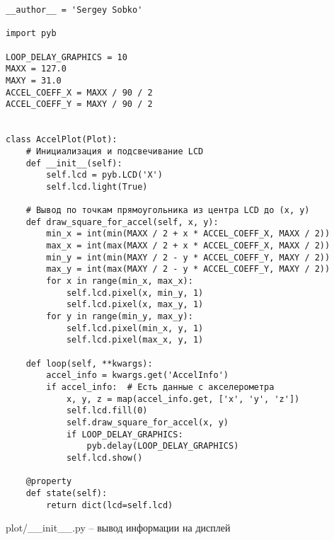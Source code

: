\documentclass[document.tex]{subfiles}
\begin{document}
\begin{listing}[ht]
\begin{verbatim}
__author__ = 'Sergey Sobko'

import pyb

LOOP_DELAY_GRAPHICS = 10
MAXX = 127.0
MAXY = 31.0
ACCEL_COEFF_X = MAXX / 90 / 2
ACCEL_COEFF_Y = MAXY / 90 / 2


class AccelPlot(Plot):
    # Инициализация и подсвечивание LCD
    def __init__(self):
        self.lcd = pyb.LCD('X')
        self.lcd.light(True) 
    
    # Вывод по точкам прямоугольника из центра LCD до (x, y)
    def draw_square_for_accel(self, x, y):
        min_x = int(min(MAXX / 2 + x * ACCEL_COEFF_X, MAXX / 2))
        max_x = int(max(MAXX / 2 + x * ACCEL_COEFF_X, MAXX / 2))
        min_y = int(min(MAXY / 2 - y * ACCEL_COEFF_Y, MAXY / 2))
        max_y = int(max(MAXY / 2 - y * ACCEL_COEFF_Y, MAXY / 2))
        for x in range(min_x, max_x):
            self.lcd.pixel(x, min_y, 1)
            self.lcd.pixel(x, max_y, 1)
        for y in range(min_y, max_y):
            self.lcd.pixel(min_x, y, 1)
            self.lcd.pixel(max_x, y, 1)

    def loop(self, **kwargs):
        accel_info = kwargs.get('AccelInfo')
        if accel_info:  # Есть данные с акселерометра
            x, y, z = map(accel_info.get, ['x', 'y', 'z'])
            self.lcd.fill(0)
            self.draw_square_for_accel(x, y)
            if LOOP_DELAY_GRAPHICS:
                pyb.delay(LOOP_DELAY_GRAPHICS)
            self.lcd.show()
            
    @property
    def state(self):
        return dict(lcd=self.lcd)
\end{verbatim}
\caption{plot/\_\_init\_\_.py -- вывод информации на дисплей}
\label{lst:lcd}
\end{listing}
\end{document}
